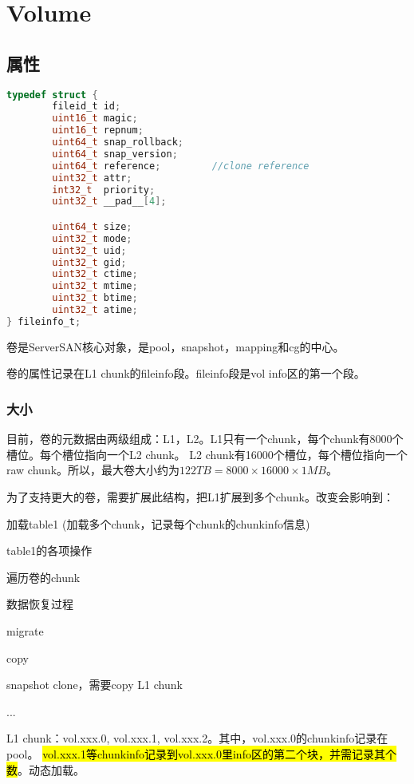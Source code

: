 \chapter{Volume}

\section{属性}

\begin{lstlisting}[language=c,frame=single]
typedef struct {
        fileid_t id;
        uint16_t magic;
        uint16_t repnum;
        uint64_t snap_rollback;
        uint64_t snap_version;
        uint64_t reference;         //clone reference
        uint32_t attr;
        int32_t  priority;
        uint32_t __pad__[4];

        uint64_t size;
        uint32_t mode;
        uint32_t uid;
        uint32_t gid;
        uint32_t ctime;
        uint32_t mtime;
        uint32_t btime;
        uint32_t atime;
} fileinfo_t;
\end{lstlisting}

卷是ServerSAN核心对象，是pool，snapshot，mapping和cg的中心。

卷的属性记录在L1 chunk的fileinfo段。fileinfo段是vol info区的第一个段。

\subsection{大小}

目前，卷的元数据由两级组成：L1，L2。L1只有一个chunk，每个chunk有8000个槽位。每个槽位指向一个L2 chunk。
L2 chunk有16000个槽位，每个槽位指向一个raw chunk。所以，最大卷大小约为$122TB = 8000 \times 16000 \times 1MB$。

为了支持更大的卷，需要扩展此结构，把L1扩展到多个chunk。改变会影响到：
\begin{compactitem}
\item 加载table1 (加载多个chunk，记录每个chunk的chunkinfo信息)
\item table1的各项操作
\item 遍历卷的chunk
\item 数据恢复过程
\item migrate
\item copy
\item snapshot clone，需要copy L1 chunk
\item ...
\end{compactitem}

L1 chunk：vol.xxx.0, vol.xxx.1, vol.xxx.2。其中，vol.xxx.0的chunkinfo记录在pool。
\hl{vol.xxx.1等chunkinfo记录到vol.xxx.0里info区的第二个块，并需记录其个数}。动态加载。

